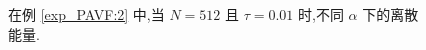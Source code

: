 \documentclass[aspectratio=169]{beamer}
\numberwithin{theorem}{section} %
\numberwithin{equation}{section}%
\numberwithin{figure}{section}%
\numberwithin{table}{section}%
\begin{document}
\begin{frame}%
	\begin{figure}[H]
		\begin{center}
		\caption{在例 \ref{exp_PAVF:2} 中,当 $N = 512$ 且 $\tau=0.01$ 时,不同 $\alpha$ 下的离散能量.}
		\label{fig_PAVF:3}
		\end{center}
		\end{figure}
\end{frame}
\end{document}
